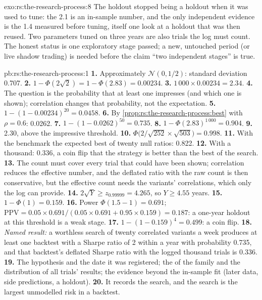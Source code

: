 \begin{solution}{exo:rs:the-research-process:8}
The holdout stopped being a holdout when it was used to tune: the 2.1 is an in-sample number, and the only independent evidence
is the 1.4 measured before tuning, itself one look at a holdout that was then reused. Two parameters tuned on three years are also
trials the log must count. The honest status is one exploratory stage passed; a new, untouched period (or live shadow trading)
is needed before the claim ``two independent stages'' is true.
\end{solution}

\begin{solution}{pb:rs:the-research-process:1}
\textbf{1.} Approximately $\mathcal N(0, 1/2)$: standard deviation 0.707. \textbf{2.} $1 - \Phi(2\sqrt2) = 1 - \Phi(2.83) = 0.00234$.
\textbf{3.} $1\,000 \times 0.00234 = 2.34$. \textbf{4.} The question is the probability that at least one impresses (and which one is
shown); correlation changes that probability, not the expectation. \textbf{5.} $1 - (1 - 0.00234)^{20} = 0.0458$.
\textbf{6.} By \cref{prop:rs:the-research-process:best} with $\rho = 0.6$: 0.0262. \textbf{7.} $1 - (1 - 0.0262)^{50} = 0.735$.
\textbf{8.} $1 - \Phi(2.83)^{1\,000} = 0.904$. \textbf{9.} 2.30, above the impressive threshold.
\textbf{10.} $\Phi\bigl(2/\sqrt{252} \times \sqrt{503}\bigr) = 0.998$. \textbf{11.} With the benchmark the expected best of twenty null
ratios: 0.822. \textbf{12.} With a thousand: 0.336, a coin flip that the strategy is better than the best of the search.
\textbf{13.} The count must cover every trial that could have been shown; correlation reduces the effective number, and the
deflated ratio with the raw count is then conservative, but the effective count needs the variants' correlations, which only
the log can provide. \textbf{14.} $2\sqrt Y \ge z_{0.99999} = 4.265$, so $Y \ge 4.55$ years.
\textbf{15.} $1 - \Phi(1) = 0.159$. \textbf{16.} Power $\Phi(1.5 - 1) = 0.691$; $\mathrm{PPV} = 0.05 \times 0.691/(0.05 \times 0.691 + 0.95
\times 0.159) = 0.187$: a one-year holdout at this threshold is a weak stage. \textbf{17.} $1 - (1 - 0.159)^4 = 0.499$: a coin
flip. \textbf{18.} \emph{Named result:} a worthless search of twenty correlated variants a week produces at least one backtest
with a Sharpe ratio of 2 within a year with probability 0.735, and that backtest's deflated Sharpe ratio with the logged
thousand trials is 0.336. \textbf{19.} The hypothesis and the date it was registered; the  of the family and the
distribution of all trials' results; the evidence beyond the in-sample fit (later data, side predictions, a holdout).
\textbf{20.} It records the search, and the search is the largest unmodelled risk in a backtest.
\end{solution}

